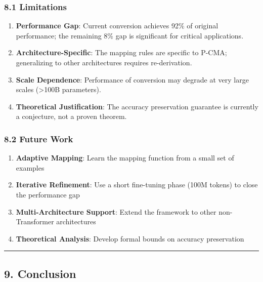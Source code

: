 \documentclass[
  11pt,
  a4paper,
]{article}
\providecommand{\tightlist}{%
  \setlength{\itemsep}{0pt}\setlength{\parskip}{0pt}}
\begin{document}
\subsubsection{8.1 Limitations}\label{limitations}

\begin{enumerate}
\def\labelenumi{\arabic{enumi}.}
\tightlist
\item
  \textbf{Performance Gap}: Current conversion achieves 92\% of original
  performance; the remaining 8\% gap is significant for critical
  applications.
\item
  \textbf{Architecture-Specific}: The mapping rules are specific to
  P-CMA; generalizing to other architectures requires re-derivation.
\item
  \textbf{Scale Dependence}: Performance of conversion may degrade at
  very large scales (\textgreater100B parameters).
\item
  \textbf{Theoretical Justification}: The accuracy preservation
  guarantee is currently a conjecture, not a proven theorem.
\end{enumerate}

\subsubsection{8.2 Future Work}\label{future-work}

\begin{enumerate}
\def\labelenumi{\arabic{enumi}.}
\tightlist
\item
  \textbf{Adaptive Mapping}: Learn the mapping function from a small set
  of examples
\item
  \textbf{Iterative Refinement}: Use a short fine-tuning phase (100M
  tokens) to close the performance gap
\item
  \textbf{Multi-Architecture Support}: Extend the framework to other
  non-Transformer architectures
\item
  \textbf{Theoretical Analysis}: Develop formal bounds on accuracy
  preservation
\end{enumerate}

\begin{center}\rule{0.5\linewidth}{0.5pt}\end{center}

\subsection{9. Conclusion}\label{conclusion}
\end{document}
